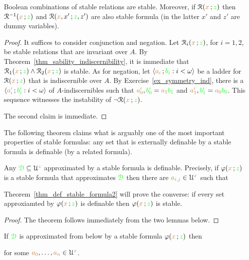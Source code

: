 \begin{lemma}\label{lem_stab_Boole}
  Boolean combinations of stable relations are stable.
  Moreover, if $\EuScript R({\color{brown} x}\,;{\color{green} z})$ then  $\EuScript R^{-1}({\color{brown} x}\,;{\color{green} z})$ and $\EuScript R({\color{brown} x},x'\,;{\color{green} z},z')$ are also stable formula (in the latter $x'$ and $z'$ are dummy variables).
\end{lemma}

\begin{proof}
  It suffices to consider conjunction and negation.
  Let $\EuScript R_i({\color{brown} x}\,;{\color{green} z})$, for $i=1,2$,  be stable relations that are invariant over $A$.
  By Theorem~\ref{thm_sability_indiscernibility}, it is immediate that $\EuScript R_1({\color{brown} x}\,;{\color{green} z})\wedge\EuScript R_2({\color{brown} x}\,;{\color{green} z})$ is stable.
  As for negation, let $\langle{\color{brown}a_i}\,;{\color{green} b_i} : i<\omega\rangle$ be a ladder for $\EuScript R({\color{brown} x}\,;{\color{green} z})$ that is indiscernible over $A$.
  By Exercise~\ref{ex_symmetry_ind}, there is a $\langle{\color{brown}a'_i}\,;{\color{green} b'_i} : i<\omega\rangle$ of $A$-indiscernibles such that ${\color{brown} a'_0},{\color{green} b'_0}={\color{brown} a_1}{\color{green} b_1}$ and ${\color{brown} a'_1},{\color{green} b'_1}={\color{brown} a_0}{\color{green} b_0}$.
  This sequence witnesses the instability of $\neg\EuScript R({\color{brown} x}\,;{\color{green} z})$.

  The second claim is immediate.
\end{proof}

The following theorem claims what is arguably one of the most important properties of stable formulas: any set that is externally definable by a stable formula is definable (by a related formula).

\begin{theorem}\label{thm_def_stable_formula}
Any ${\color{green}\EuScript D}\subseteq\EuScript U^{\color{green} z}$ approximated by a stable formula is definable.
Precisely, if $\varphi({\color{brown} x}\,;{\color{green} z})$ is a stable formula that approximates ${\color{green}\EuScript D}$ then there are ${\color{brown} a_{i,j}}\in\EuScript U^{\color{brown} x}$ such that

\end{theorem}

Theorem~\ref{thm_def_stable_formula2} will prove the converse: if every set approxiamted by $\varphi({\color{brown} x}\,;{\color{green} z})$ is definable then $\varphi({\color{brown} x}\,;{\color{green} z})$ is stable.

\begin{proof}
  The theorem follows immediately from the two lemmas below.
\end{proof}

\begin{lemma}
If ${\color{green}\EuScript D}$ is approximated from below by a stable formula $\varphi({\color{brown} x}\,;{\color{green} z})$ then


for some ${\color{brown} a_0},\dots,{\color{brown} a_n}\in\EuScript U^{\color{brown} x}$.
\end{lemma}

